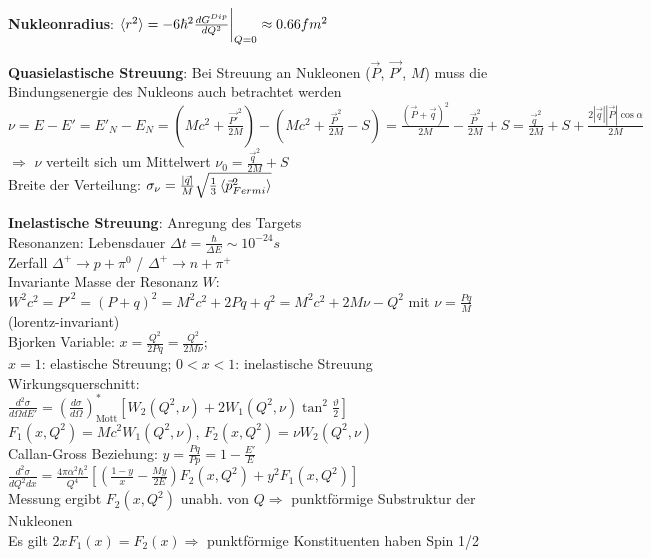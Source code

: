 \documentclass[10pt,twoside,a4paper]{article}
\begin{document}
\begin{multicols*}{3}
\textbf{Nukleonradius}: $\braket{r^2} = -6 \hbar^2 \frac{dG^{Dip}}{dQ^2}\bigg|_{Q=0} \approx 0.66 fm^2$

\textbf{Quasielastische Streuung}: Bei Streuung an Nukleonen ($\vec{P}$, $\vec{P'}$, $M$) muss die Bindungsenergie des Nukleons auch betrachtet werden \\
$\nu = E - E' = E'_N - E_N = (M c^2 + \frac{\vec{P'}^2}{2 M}) - (M c^2 + \frac{\vec{P}^2}{2 M} - S) = \frac{(\vec{P} + \vec{q})^2}{2 M} - \frac{\vec{P}^2}{2 M} + S = \frac{\vec{q}^2}{2 M} + S + \frac{2 |\vec{q}| |\vec{P}| \cos \alpha}{2 M}$ \\
$\Rightarrow$ $\nu$ verteilt sich um Mittelwert $\nu_0 = \frac{\vec{q}^2}{2 M} + S$ \\
Breite der Verteilung: $\sigma_{\nu} = \frac{|\vec{q}|}{M} \sqrt{\frac{1}{3} \braket{\vec{p}^2_{Fermi}}}$

\textbf{Inelastische Streuung}: Anregung des Targets \\
Resonanzen: Lebensdauer $\Delta t = \frac{\hbar}{\Delta E} \sim 10^{-24} s$ \\
Zerfall $\Delta^+ \to p + \pi^0$ / $\Delta^+ \to n + \pi^+$ \\
Invariante Masse der Resonanz $W$: $W^2 c^2 = P'^2 = (P + q)^2 = M^2 c^2 + 2 P q + q^2 = M^2 c^2 + 2 M \nu - Q^2$ mit $\nu = \frac{P q}{M}$ (lorentz-invariant) \\
Bjorken Variable: $x=\frac{Q^2}{2 P q} = \frac{Q^2}{2 M \nu}$; \\
$x=1$: elastische Streuung; $0<x<1$: inelastische Streuung \\
Wirkungsquerschnitt: \\
$\frac{d^2 \sigma}{d\Omega dE'} = \left( \frac{d\sigma}{d\Omega} \right)^*_{\text{Mott}} \left[ W_2(Q^2, \nu) + 2 W_1(Q^2, \nu) \tan^2 \frac{\vartheta}{2} \right]$ \\
$F_1(x,Q^2) = M c^2 W_1(Q^2, \nu)$, $F_2(x,Q^2) = \nu W_2(Q^2, \nu)$ \\
Callan-Gross Beziehung: $y = \frac{P q}{P p} = 1 - \frac{E'}{E}$ \\
$\scriptscriptstyle\frac{d^2\sigma}{dQ^2 dx} = \frac{4 \pi \alpha^2 \hbar^2}{Q^4} \left[ \left( \frac{1-y}{x} - \frac{M y}{2 E} \right) F_2(x,Q^2) + y^2 F_1(x,Q^2) \right]$ \\
Messung ergibt $F_2(x,Q^2)$ unabh. von $Q \Rightarrow$ punktförmige Substruktur der Nukleonen \\
Es gilt $2 x F_1(x) = F_2(x) \Rightarrow$ punktförmige Konstituenten haben Spin 1/2


\end{multicols*}
\end{document}
